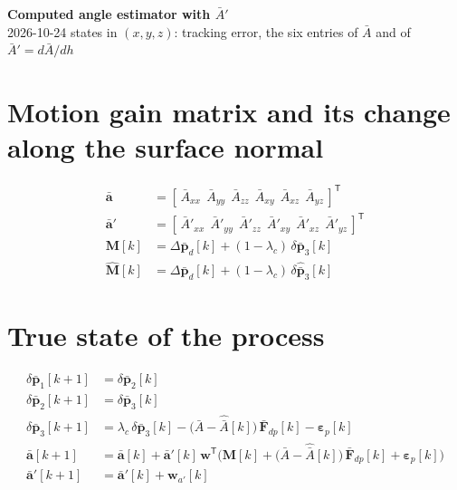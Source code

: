 \documentclass[11pt,a4paper]{ctexart}
\newcommand{\lc}{\lambda_c}
\newcommand{\dpb}{\delta\bar{\mathbf p}}
\newcommand{\dph}{\delta\hat{\bar{\mathbf p}}}
\newcommand{\Ab}{\bar{A}}
\newcommand{\Ah}{\hat{\bar A}}
\newcommand{\Abp}{\bar{A}'}
\newcommand{\av}{\bar{\mathbf a}}
\newcommand{\avp}{\bar{\mathbf a}'}
\newcommand{\Fd}{\bar{\mathbf F}_{dp}}
\newcommand{\Mh}{\hat{\mathbf M}}
\newcommand{\Mb}{\mathbf M}
\newcommand{\epp}{\boldsymbol\varepsilon_p}
\newcommand{\ww}{\mathbf w}
\begin{document}
\begin{center}\textbf{\large Computed angle estimator with $\bar A'$}\\[2pt]
\small 2026-10-24 \quad states in $(x, y, z)$: tracking error, the six entries of $\Ab$ and of $\Abp = d\Ab/dh$\end{center}

\section{Motion gain matrix and its change along the surface normal}
\begin{align*}
\av &= [\,\Ab_{xx}\ \ \Ab_{yy}\ \ \Ab_{zz}\ \ \Ab_{xy}\ \ \Ab_{xz}\ \ \Ab_{yz}\,]^{\mathsf T} \\
\avp &= [\,\Abp_{xx}\ \ \Abp_{yy}\ \ \Abp_{zz}\ \ \Abp_{xy}\ \ \Abp_{xz}\ \ \Abp_{yz}\,]^{\mathsf T} \\
\Mb[k] &= \Delta\bar{\mathbf p}_d[k] + (1-\lc)\,\dpb_3[k] \\
\Mh[k] &= \Delta\bar{\mathbf p}_d[k] + (1-\lc)\,\dph_3[k]
\end{align*}

\section{True state of the process}
\begin{align*}
\dpb_1[k+1] &= \dpb_2[k] \\
\dpb_2[k+1] &= \dpb_3[k] \\
\dpb_3[k+1] &= \lc\,\dpb_3[k] - \big(\Ab - \Ah[k]\big)\,\Fd[k] - \epp[k] \\
\av[k+1] &= \av[k] + \avp[k]\,\ww^{\mathsf T}\Big(\Mb[k] + \big(\Ab - \Ah[k]\big)\,\Fd[k] + \epp[k]\Big) \\
\avp[k+1] &= \avp[k] + \mathbf w_{a'}[k]
\end{align*}

\end{document}

